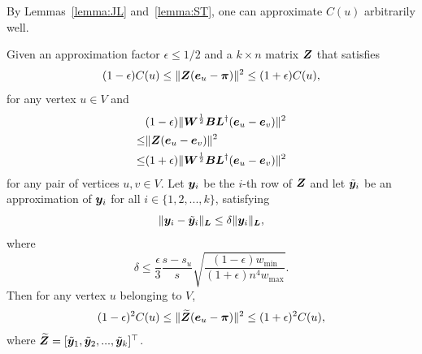 \documentclass[10pt,journal,compsoc,twocolumn,twoside]{IEEEtran}
\begin{document}
By Lemmas~\ref{lemma:JL} and~\ref{lemma:ST}, one can approximate \(C(u)\) arbitrarily well.

\begin{lemma}\label{lem:error1}
    Given an approximation factor \(\epsilon \le 1/2\) and a \(k\times n\) matrix \(\boldsymbol{Z}\) that satisfies
    \[
        (1-\epsilon) C(u)
        \leq
        \|\boldsymbol{Z} (\boldsymbol{e}_{u} - \boldsymbol{\pi})\|^{2}
        \leq
        (1+\epsilon)  C(u),
    \]
    for any vertex \(u\in V\) and
    \begin{align*}
             & (1-\epsilon) \|\boldsymbol{W}^{\frac{1}{2}} \boldsymbol{B} \boldsymbol{L}^{\dagger} (\boldsymbol{e}_u-\boldsymbol{e}_v)\|^2 \\
        \leq &
        \|\boldsymbol{Z} (\boldsymbol{e}_u - \boldsymbol{e}_v)\|^2                                                      \\
        \leq &
        (1+\epsilon) \|\boldsymbol{W}^{\frac{1}{2}} \boldsymbol{B} \boldsymbol{L}^{\dagger} (\boldsymbol{e}_u-\boldsymbol{e}_v)\|^2
    \end{align*}
    for any pair of vertices \(u,v \in V\).
    Let \(\boldsymbol{y}_i\) be the \(i\)-th row of \(\boldsymbol{Z}\) and let \(\tilde{\boldsymbol{y}}_i\) be an approximation of \(\boldsymbol{y}_i\) for all \(i \in \{1,2,...,k\}\), satisfying
    \begin{equation}\label{EE13} \|\boldsymbol{y}_i-\tilde{\boldsymbol{y}}_i\|_{\boldsymbol{L}}\le\delta
        \|\boldsymbol{y}_{i}\|_{\boldsymbol{L}},
    \end{equation}
    where
    \begin{equation}\label{EE14}
        \delta \leq  \frac{\epsilon }{3} \frac{s-s_u}{s}
        \sqrt{\frac{(1-\epsilon) w_{\min}}{(1+\epsilon) n^4 w_{\max}}}.
    \end{equation}
    Then for any vertex \(u\) belonging to \(V\),
    \begin{align}
        \label{EE15}
        (1 - \epsilon)^2  C(u)
        \leq
        \|\widetilde{\boldsymbol{Z}}  (\boldsymbol{e}_{u} - \boldsymbol{\pi})\|^2
        \leq
        (1 + \epsilon)^2  C(u),
    \end{align}
    where \(\widetilde{\boldsymbol{Z}} = [\tilde{\boldsymbol{y}}_1, \tilde{\boldsymbol{y}}_2, ..., \tilde{\boldsymbol{y}}_k]^\top\).
\end{lemma}
\end{document}
